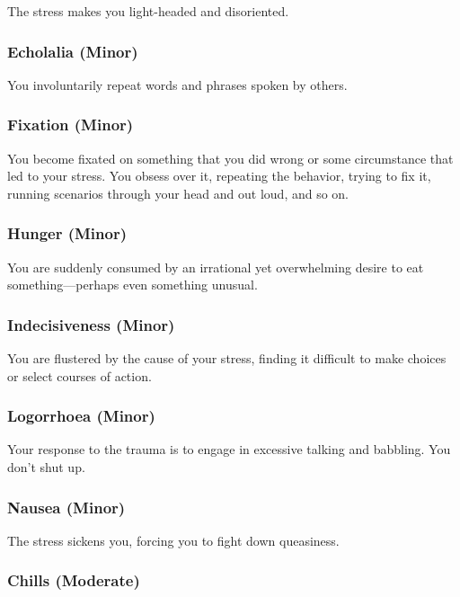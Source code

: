 The stress makes you light-headed and disoriented.

\subsubsection{Echolalia (Minor)}

You involuntarily repeat words and phrases spoken 
by others.

\subsubsection{Fixation (Minor)}

You become fixated on something that you did wrong 
or some circumstance that led to your stress. You 
obsess over it, repeating the behavior, trying to fix it, 
running scenarios through your head and out loud, 
and so on.

\subsubsection{Hunger (Minor)}

You are suddenly consumed by an irrational yet 
overwhelming desire to eat something—perhaps even 
something unusual.

\subsubsection{Indecisiveness (Minor)}

You are flustered by the cause of your stress, finding it 
difficult to make choices or select courses of action.

\subsubsection{Logorrhoea (Minor)}

Your response to the trauma is to engage in excessive 
talking and babbling. You don't shut up.

\subsubsection{Nausea (Minor)}

The stress sickens you, forcing you to fight  down 
queasiness.

\subsubsection{Chills (Moderate)}

